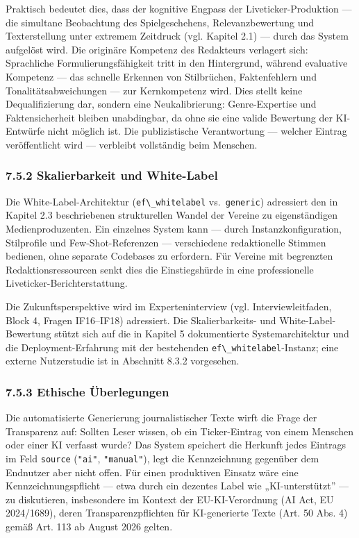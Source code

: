 Praktisch bedeutet dies, dass der kognitive Engpass der
Liveticker-Produktion --- die simultane Beobachtung des Spielgeschehens,
Relevanzbewertung und Texterstellung unter extremem Zeitdruck (vgl.
Kapitel 2.1) --- durch das System aufgelöst wird. Die originäre
Kompetenz des Redakteurs verlagert sich: Sprachliche
Formulierungsfähigkeit tritt in den Hintergrund, während evaluative
Kompetenz --- das schnelle Erkennen von Stilbrüchen, Faktenfehlern und
Tonalitätsabweichungen --- zur Kernkompetenz wird. Dies stellt keine
Dequalifizierung dar, sondern eine Neukalibrierung: Genre-Expertise und
Faktensicherheit bleiben unabdingbar, da ohne sie eine valide Bewertung
der KI-Entwürfe nicht möglich ist. Die publizistische Verantwortung ---
welcher Eintrag veröffentlicht wird --- verbleibt vollständig beim
Menschen.

\subsubsection{7.5.2 Skalierbarkeit und
White-Label}\label{skalierbarkeit-und-white-label}

Die White-Label-Architektur (\passthrough{\lstinline!ef\_whitelabel!}
vs.~\passthrough{\lstinline!generic!}) adressiert den in Kapitel 2.3
beschriebenen strukturellen Wandel der Vereine zu eigenständigen
Medienproduzenten. Ein einzelnes System kann --- durch
Instanzkonfiguration, Stilprofile und Few-Shot-Referenzen ---
verschiedene redaktionelle Stimmen bedienen, ohne separate Codebases zu
erfordern. Für Vereine mit begrenzten Redaktionsressourcen senkt dies
die Einstiegshürde in eine professionelle Liveticker-Berichterstattung.

Die Zukunftsperspektive wird im Experteninterview (vgl.
Interviewleitfaden, Block 4, Fragen IF16--IF18) adressiert. Die
Skalierbarkeits- und White-Label-Bewertung stützt sich auf die in
Kapitel 5 dokumentierte Systemarchitektur und die Deployment-Erfahrung
mit der bestehenden \passthrough{\lstinline!ef\_whitelabel!}-Instanz;
eine externe Nutzerstudie ist in Abschnitt 8.3.2 vorgesehen.

\subsubsection{7.5.3 Ethische
Überlegungen}\label{ethische-uxfcberlegungen}

Die automatisierte Generierung journalistischer Texte wirft die Frage
der Transparenz auf: Sollten Leser wissen, ob ein Ticker-Eintrag von
einem Menschen oder einer KI verfasst wurde? Das System speichert die
Herkunft jedes Eintrags im Feld \passthrough{\lstinline!source!}
(\passthrough{\lstinline!"ai"!}, \passthrough{\lstinline!"manual"!}),
legt die Kennzeichnung gegenüber dem Endnutzer aber nicht offen. Für
einen produktiven Einsatz wäre eine Kennzeichnungspflicht --- etwa durch
ein dezentes Label wie „KI-unterstützt'' --- zu diskutieren,
insbesondere im Kontext der EU-KI-Verordnung (AI Act, EU 2024/1689),
deren Transparenzpflichten für KI-generierte Texte (Art. 50 Abs. 4)
gemäß Art. 113 ab August 2026 gelten.

